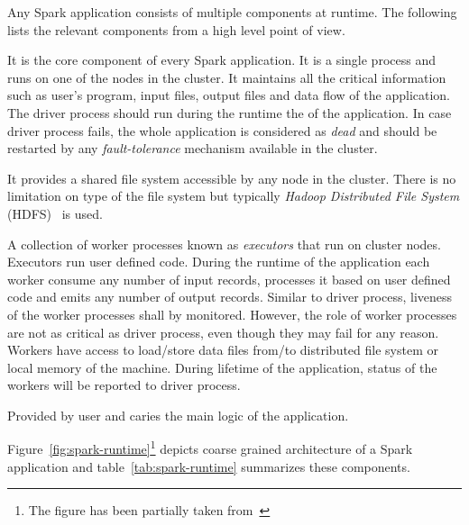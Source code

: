 Any Spark application consists of multiple components at runtime. The following lists the relevant components from a high level point of view.
\begin{description}[leftmargin=0pt]
    \item[Driver Process] It is the core component of every Spark application. It is a single process and runs on one of the nodes in the cluster. It maintains all the critical information such as user's program, input files, output files and data flow of the application. The driver process should run during the runtime the of the application. In case driver process fails, the whole application is considered as \emph{dead} and should be restarted by any \emph{fault-tolerance} mechanism available in the cluster.
    \item[Distributed File System] It provides a shared file system accessible by any node in the cluster. There is no limitation on type of the file system but typically \emph{Hadoop Distributed File System} (HDFS)~\cite{hadoop} is used.
    \item[Worker Processes] A collection of worker processes known as \emph{executors} that run on cluster nodes. Executors run user defined code. During the runtime of the application each worker consume any number of input records, processes it based on user defined code and emits any number of output records. Similar to driver process, liveness of the worker processes shall by monitored. However, the role of worker processes are not as critical as driver process, even though they may fail for any reason. Workers have access to load/store data files from/to distributed file system or local memory of the machine. During lifetime of the application, status of the workers will be reported to driver process.
    \item[User Defined Code] Provided by user and caries the main logic of the application.
\end{description}
Figure~\ref{fig:spark-runtime}\footnote{The figure has been partially taken from~\textcite{Zaharia:2012}} depicts coarse grained architecture of a Spark application and table~\ref{tab:spark-runtime} summarizes these components.
